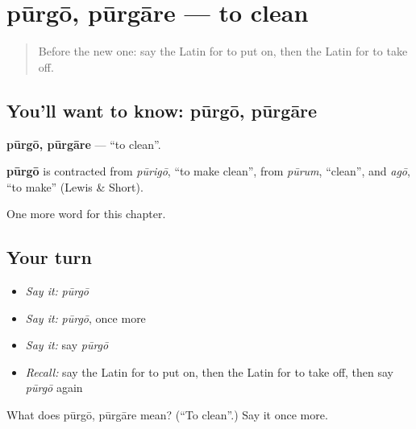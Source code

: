 \section[pūrgō, pūrgāre]{pūrgō, pūrgāre — to clean}

\label{lesson:LA-C155-purgo}



\begin{quote}
Before the new one: say the Latin for to put on, then the Latin for to take off.
\end{quote}

\subsection*{You'll want to know: pūrgō, pūrgāre}
\textbf{pūrgō, pūrgāre} — \textquotedblleft{}to clean\textquotedblright{}.

\begin{cousinweb}
\textbf{pūrgō} is contracted from \emph{pūrigō}, \textquotedblleft{}to make clean\textquotedblright{}, from \emph{pūrum}, \textquotedblleft{}clean\textquotedblright{}, and \emph{agō}, \textquotedblleft{}to make\textquotedblright{} (Lewis \& Short).
\end{cousinweb}

\begin{grammarlens}[title={What you've built}]
One more word for this chapter.
\end{grammarlens}

\subsection*{Your turn}
\begin{itemize}
\raggedright
  \item \emph{Say it:} \emph{pūrgō}
  \item \emph{Say it:} \emph{pūrgō}, once more
  \item \emph{Say it:} say \emph{pūrgō}
  \item \emph{Recall:} say the Latin for to put on, then the Latin for to take off, then say \emph{pūrgō} again
\end{itemize}

\begin{tcolorbox}[breakable,colback=teal!4,colframe=teal!35!black,title={Before you move on}]
What does pūrgō, pūrgāre mean? (\textquotedblleft{}To clean\textquotedblright{}.) Say it once more.
\end{tcolorbox}
